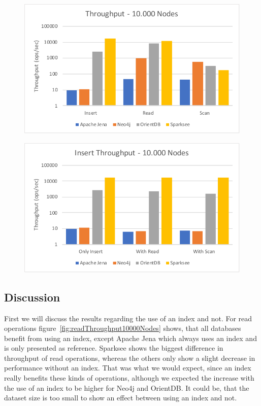 \begin{figure}[h!]
  \begin{minipage}{.5\textwidth}
    \centering
    \includegraphics[width=\textwidth]{images/responsiveness/operationReadScan}
    \label{fig:operationReadScan}
  \end{minipage}
  \begin{minipage}{.5\textwidth}
    \centering
    \includegraphics[width=\textwidth]{images/responsiveness/insertWithWithoutReadScan}
    \label{fig:insertWithWithoutReadScan}
  \end{minipage}
\end{figure}

\subsection{Discussion}
First we will discuss the results regarding the use of an index and not.
For read operations figure~\ref{fig:readThroughput10000Nodes} shows,
that all databases benefit from using an index,
except Apache Jena which always uses an index and is only presented as reference.
Sparksee shows the biggest difference in throughput of read operations,
whereas the others only show a slight decrease in performance without an index.
That was what we would expect,
since an index really benefits these kinds of operations,
although we expected the increase with the use of an index to be higher for Neo4j and OrientDB.
It could be,
that the dataset size is too small to show an effect between using an index and not.

